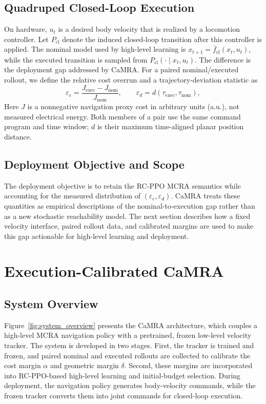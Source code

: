 \documentclass[conference]{IEEEtran}
\begin{document}
\subsection{Quadruped Closed-Loop Execution}
On hardware, $u_t$ is a desired body velocity that is realized by a locomotion
controller. Let $P_{\mathrm{cl}}$ denote the induced closed-loop transition after
this controller is applied. The nominal model used by high-level learning is
$x_{t+1}=\bar f_{\mathrm{cl}}(x_t,u_t)$, while the executed transition is sampled
from $P_{\mathrm{cl}}(\cdot\mid x_t,u_t)$. The difference is the deployment gap
addressed by CaMRA. For a paired nominal/executed rollout, we define the relative
cost overrun and a trajectory-deviation statistic as
\begin{equation}
\varepsilon_c=\frac{J_{\mathrm{exec}}-J_{\mathrm{nom}}}{J_{\mathrm{nom}}},
\qquad
\varepsilon_d=d(\tau_{\mathrm{exec}},\tau_{\mathrm{nom}}),
\end{equation}
Here $J$ is a nonnegative navigation proxy cost in arbitrary units (a.u.),
not measured electrical energy. Both members of a pair use the same command
program and time window; $d$ is their maximum time-aligned planar position
distance.

\subsection{Deployment Objective and Scope}
The deployment objective is to retain the RC-PPO MCRA semantics while accounting
for the measured distribution of $(\varepsilon_c,\varepsilon_d)$. CaMRA treats
these quantities as empirical descriptions of the nominal-to-execution gap rather
than as a new stochastic reachability model. The next section describes how a
fixed velocity interface, paired rollout data, and calibrated margins are used to
make this gap actionable for high-level learning and deployment.

\section{Execution-Calibrated CaMRA}
\subsection{System Overview}
Figure~\ref{fig:system_overview} presents the CaMRA architecture, which couples
a high-level MCRA navigation policy with a pretrained, frozen low-level velocity
tracker. The system is developed in two stages. First, the tracker is trained and
frozen, and paired nominal and executed rollouts are collected to calibrate the
cost margin $\alpha$ and geometric margin $\delta$. Second, these margins are
incorporated into RC-PPO-based high-level learning and initial-budget selection.
During deployment, the navigation policy generates body-velocity commands, while
the frozen tracker converts them into joint commands for closed-loop execution.
\end{document}
